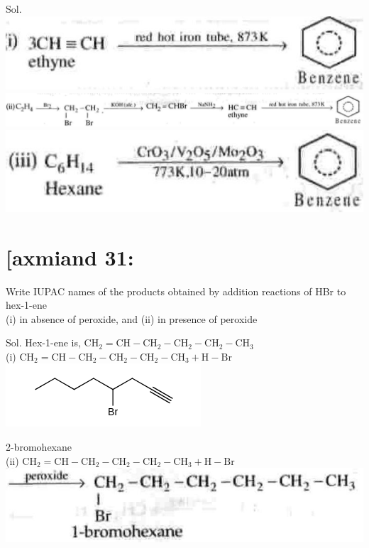 \documentclass[10pt]{article}
\begin{document}
Sol.\\
\includegraphics[max width=\textwidth, center]{2025_01_28_8470952b98110cec3aabg-225}\\
\includegraphics[max width=\textwidth, center]{2025_01_28_8470952b98110cec3aabg-225(1)}\\
\includegraphics[max width=\textwidth, center]{2025_01_28_8470952b98110cec3aabg-225(2)}

\section*{[axmiand 31:}
Write IUPAC names of the products obtained by addition reactions of HBr to hex-1-ene\\
(i) in absence of peroxide, and (ii) in presence of peroxide

Sol. Hex-1-ene is, $\mathrm{CH}_{2}=\mathrm{CH}-\mathrm{CH}_{2}-\mathrm{CH}_{2}-\mathrm{CH}_{2}-\mathrm{CH}_{3}$\\
(i) $\mathrm{CH}_{2}=\mathrm{CH}-\mathrm{CH}_{2}-\mathrm{CH}_{2}-\mathrm{CH}_{2}-\mathrm{CH}_{3}+\mathrm{H}-\mathrm{Br}$\\
\includegraphics{smile-e3a1ca78c9fa8490da4135bdb2ff039201b86d6b}

2-bromohexane\\
(ii) $\mathrm{CH}_{2}=\mathrm{CH}-\mathrm{CH}_{2}-\mathrm{CH}_{2}-\mathrm{CH}_{2}-\mathrm{CH}_{3}+\mathrm{H}-\mathrm{Br}$\\
\includegraphics[max width=\textwidth, center]{2025_01_28_8470952b98110cec3aabg-225(3)}
\end{document}
